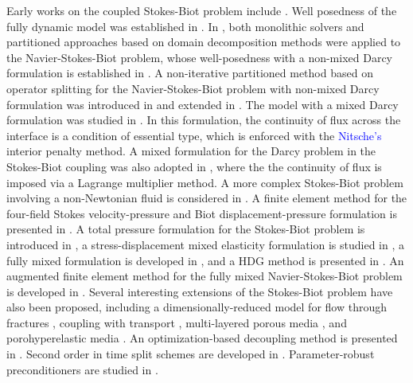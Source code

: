 \documentclass[11pt]{article}
\begin{document}
Early works on the coupled Stokes-Biot problem include \cite{muradg2,s2005}. Well posedness of the fully dynamic model was established in \cite{s2005}. In \cite{bqq2009},
both monolithic solvers and partitioned approaches based on 
domain decomposition methods \cite{B-quarteroniv1} 
were applied to the Navier-Stokes-Biot problem, whose well-posedness with a non-mixed Darcy formulation is established in \cite{cesm2017}.
A non-iterative partitioned method based on 
operator splitting for the Navier-Stokes-Biot problem
with non-mixed Darcy formulation was introduced in 
\cite{byz2015} and extended in \cite{Bukac-JCP}. The model with a mixed 
Darcy formulation was studied in \cite{fpsi-nitsche}. In this formulation, the continuity of flux
across the interface is a condition of essential type, 
which is enforced with the \textcolor{blue}{Nitsche's} interior penalty method. A mixed formulation for the Darcy problem in the Stokes-Biot coupling was also adopted 
in \cite{akyz2018}, where the the continuity of flux is
imposed via a Lagrange multiplier method.
A more complex Stokes-Biot problem involving a non-Newtonian fluid is considered in \cite{aeny2019}.
A finite element method for the four-field Stokes velocity-pressure and Biot displacement-pressure formulation is presented in \cite{Cesm-Chid}. A total pressure formulation for the Stokes-Biot problem is introduced in 
\cite{Stokes-Biot-eye}, a stress-displacement mixed elasticity formulation is studied in \cite{fpsi-mixed-elast}, a fully mixed formulation is developed in \cite{fpsi-msfmfe}, and a HDG method is presented in \cite{HDG-SB}. An augmented finite element method for the fully mixed Navier-Stokes-Biot problem is developed in \cite{fpsi-augmented}.
Several interesting extensions of the Stokes-Biot problem have also been proposed, including a dimensionally-reduced model for flow through fractures \cite{Buk-Yot-Zun-fracture}, coupling with transport \cite{fpsi-transport,Canic-stent},
multi-layered porous media \cite{Bociu-etal-2021}, 
and porohyperelastic media \cite{Seboldt-etal-2021}. An optimization-based decoupling method is presented in \cite{Cesm-etal-optim}. Second order in time split schemes are developed in
\cite{Kunwar-etal,pb2024}. Parameter-robust preconditioners are studied in \cite{Boon-etal-precond}.
\end{document}
